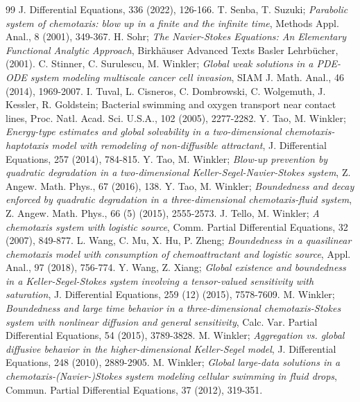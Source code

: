 \documentclass[10pt,a4paper]{amsart}
\numberwithin{equation}{section}
\begin{document}
\begin{thebibliography}{99}
J. Differential Equations, 336 (2022), 126-166.
 T. Senba, T. Suzuki;
\emph{Parabolic system of chemotaxis: blow up in a finite and the infinite time},
 Methods Appl. Anal., 8 (2001), 349-367.
 H. Sohr;
\emph{The Navier-Stokes Equations: An Elementary Functional Analytic Approach}, 
Birkh\"auser Advanced Texts Basler Lehrb\"{u}cher, (2001).
 C. Stinner, C. Surulescu, M. Winkler;
\emph{Global weak solutions in a PDE-ODE system modeling multiscale cancer cell 
invasion}, SIAM J. Math. Anal., 46 (2014), 1969-2007.
 I. Tuval, L. Cisneros, C. Dombrowski, C. Wolgemuth, J. Kessler, R. Goldstein; Bacterial swimming and oxygen transport near contact lines, Proc. Natl. Acad. Sci. U.S.A., 102 (2005), 2277-2282.
 Y. Tao, M. Winkler;
\emph{Energy-type estimates and global solvability in a two-dimensional 
chemotaxis-haptotaxis model with remodeling of non-diffusible attractant}, 
J. Differential Equations, 257 (2014), 784-815.
 Y. Tao, M. Winkler;
\emph{Blow-up prevention by quadratic degradation in a two-dimensional 
Keller-Segel-Navier-Stokes system}, Z. Angew. Math. Phys., 67 (2016), 138.
 Y. Tao, M. Winkler;
\emph{Boundedness and decay enforced by quadratic degradation in a three-dimensional 
chemotaxis-fluid system}, Z. Angew. Math. Phys., 66 (5) (2015), 2555-2573.
 J. Tello, M. Winkler;
\emph{A chemotaxis system with logistic source}, 
Comm. Partial Differential Equations, 32 (2007), 849-877.
 L. Wang, C. Mu, X. Hu, P. Zheng;
\emph{Boundedness in a quasilinear chemotaxis model with consumption of 
chemoattractant and logistic source}, Appl. Anal., 97 (2018), 756-774.
 Y. Wang, Z. Xiang;
\emph{Global existence and boundedness in a Keller-Segel-Stokes system involving 
a tensor-valued sensitivity with saturation}, 
J. Differential Equations, 259 (12) (2015), 7578-7609.
 M. Winkler;
\emph{Boundedness and large time behavior in a three-dimensional chemotaxis-Stokes 
system with nonlinear diffusion and general sensitivity}, 
Calc. Var. Partial Differential Equations, 54 (2015), 3789-3828.
 M. Winkler;
\emph{Aggregation vs. global diffusive behavior in the higher-dimensional Keller-Segel
 model}, J. Differential Equations, 248 (2010), 2889-2905.
 M. Winkler;
\emph{Global large-data solutions in a chemotaxis-(Navier-)Stokes system modeling 
cellular swimming in fluid drops}, 
Commun. Partial Differential Equations, 37 (2012), 319-351.

\end{thebibliography}
\end{document}
